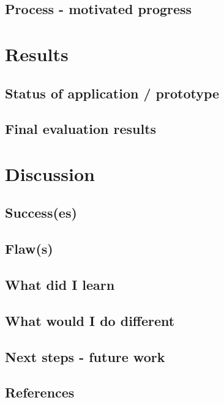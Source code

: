 \documentclass[]{report}
\begin{document}
\section{Process - motivated progress}

\chapter{Results}

\section{Status of application / prototype}

\section{Final evaluation results}

\chapter{Discussion}

\section{Success(es)}

\section{Flaw(s)}

\section{What did I learn}

\section{What would I do different}

\section{Next steps - future work}

\section{References}

{}

\end{document}
